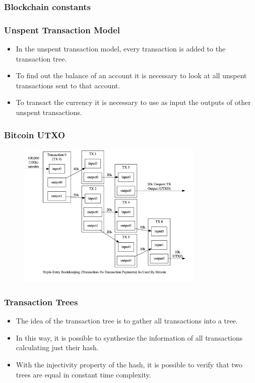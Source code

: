 \documentclass{beamer}
\begin{document}
\begin{frame}
  \frametitle{Blockchain constants}
\end{frame}

\begin{frame}
   \frametitle{Unspent Transaction Model}
   \begin{itemize}
     \item In the unspent transaction model, every transaction is added to the transaction tree.
     \item To find out the balance of an account it is necessary to look at all unspent transactions
       sent to that account.
     \item To transact the currency it is necessary to use as input the outputs of
       other unspent transactions.
   \end{itemize}
\end{frame}

\begin{frame}
  \frametitle{Bitcoin UTXO}
    \includegraphics[width=11cm, height=7cm]{utxo}
\end{frame}

\begin{frame}
   \frametitle{Transaction Trees}
   \begin{itemize}
     \item The idea of the transaction tree is to gather all transactions into a tree.
     \item In this way, it is possible to synthesize the information of all transactions
       calculating just their hash.
     \item With the injectivity property of the hash, it is possible to verify that two trees
       are equal in constant time complexity.
   \end{itemize}
\end{frame}
\end{document}
